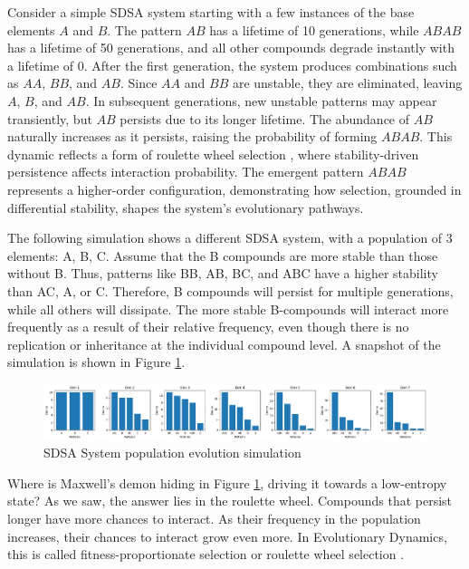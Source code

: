\documentclass[preprint,12pt]{elsarticle}
\begin{document}
Consider a simple SDSA system starting with a few instances of the base elements \( A \) and \( B \). The pattern \( AB \) has a lifetime of 10 generations, while \( ABAB \) has a lifetime of 50 generations, and all other compounds degrade instantly with a lifetime of 0. After the first generation, the system produces combinations such as \( AA \), \( BB \), and \( AB \). Since \( AA \) and \( BB \) are unstable, they are eliminated, leaving \( A \), \( B \), and \( AB \). In subsequent generations, new unstable patterns may appear transiently, but \( AB \) persists due to its longer lifetime. The abundance of \( AB \) naturally increases as it persists, raising the probability of forming \( ABAB \). This dynamic reflects a form of roulette wheel selection \cite{goldberg1989genetic} \cite{holland1975adaptation}, where stability-driven persistence affects interaction probability. The emergent pattern \( ABAB \) represents a higher-order configuration, demonstrating how selection, grounded in differential stability, shapes the system's evolutionary pathways. 

The following simulation shows a different SDSA system, with a population of 3 elements: {A, B, C}. Assume that the B compounds are more stable than those without B. Thus, patterns like BB, AB, BC, and ABC have a higher stability than AC, A, or C. Therefore, B compounds will persist for multiple generations, while all others will dissipate. The more stable B-compounds will interact more frequently as a result of their relative frequency, even though there is no replication or inheritance at the individual compound level. A snapshot of the simulation is shown in Figure \ref{fig:figure_2}.

\begin{figure}[htp]
    \centering
    \includegraphics[width=1\textwidth]{figure_2}
    \caption{SDSA System population evolution simulation}
    \label{fig:figure_2}
\end{figure}

Where is Maxwell's demon \cite{leff2002maxwell} hiding in Figure \ref{fig:figure_2}, driving it towards a low-entropy state? As we saw, the answer lies in the roulette wheel. Compounds that persist longer have more chances to interact. As their frequency in the population increases, their chances to interact grow even more. In Evolutionary Dynamics, this is called fitness-proportionate selection \cite{back1996evolutionary} or roulette wheel selection \cite{goldberg1989genetic} \cite{holland1975adaptation}.
\end{document}
